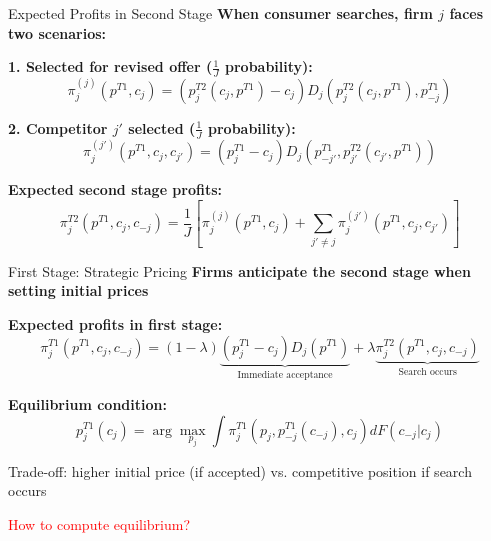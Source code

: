 \documentclass[10pt,aspectratio=169]{beamer}
\begin{document}

\begin{frame}{Expected Profits in Second Stage}
\textbf{When consumer searches, firm $j$ faces two scenarios:}

\vspace{0.3cm}

\textbf{1. Selected for revised offer ($\frac{1}{J}$ probability):}
$$\pi^{(j)}_j(p^{T1}, c_j) = (p^{T2}_j(c_j, p^{T1}) - c_j) D_j(p^{T2}_j(c_j, p^{T1}), p^{T1}_{-j})$$

\vspace{0.3cm}

\textbf{2. Competitor $j'$ selected ($\frac{1}{J}$ probability):}
$$\pi^{(j')}_j(p^{T1}, c_j, c_{j'}) = (p^{T1}_j - c_j) D_j(p^{T1}_{-j'}, p^{T2}_{j'}(c_{j'}, p^{T1}))$$

\vspace{0.5cm}

\textbf{Expected second stage profits:}
$$\pi^{T2}_j(p^{T1}, c_j, c_{-j}) = \frac{1}{J}\left[\pi^{(j)}_j(p^{T1}, c_j) + \sum_{j' \neq j} \pi^{(j')}_j(p^{T1}, c_j, c_{j'})\right]$$
\end{frame}


\begin{frame}{First Stage: Strategic Pricing}
\textbf{Firms anticipate the second stage when setting initial prices}

\vspace{0.5cm}

\textbf{Expected profits in first stage:}
$$\pi^{T1}_j(p^{T1}, c_j, c_{-j}) = (1-\lambda)\underbrace{(p^{T1}_j - c_j)D_j(p^{T1})}_{\text{Immediate acceptance}} + \lambda \underbrace{\pi^{T2}_j(p^{T1}, c_j, c_{-j})}_{\text{Search occurs}}$$

\vspace{0.5cm}

\textbf{Equilibrium condition:}
$$p^{T1}_j(c_j) = \arg\max_{p_j} \int \pi^{T1}_j(p_j, p^{T1}_{-j}(c_{-j}), c_j) dF(c_{-j}|c_j)$$

\vspace{0.3cm}
Trade-off: higher initial price (if accepted) vs. competitive position if search occurs

\textcolor{red}{How to compute equilibrium?}
\end{frame}
\end{document}

